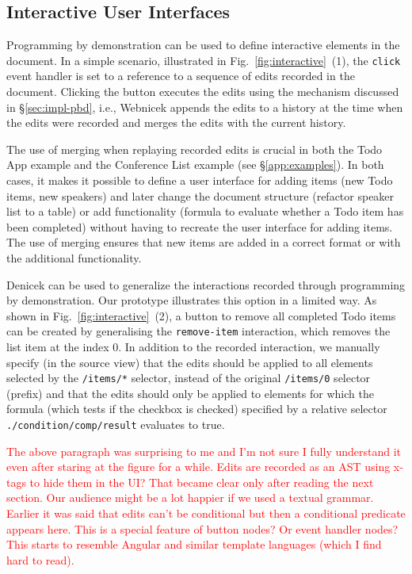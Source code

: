 \documentclass[sigconf,anonymous,screen]{acmart}
\newcommand{\note}[1]{\textcolor{red}{#1}}
\begin{document}

\subsection{Interactive User Interfaces}
\label{sec:impl-interaction}

Programming by demonstration can be used to define interactive elements in the document. In a
simple scenario, illustrated in Fig.~\ref{fig:interactive}~(1), the {\small\Verb_click_} event
handler is set to a reference to a sequence of edits recorded in the document. Clicking the button
executes the edits using the mechanism discussed in \S\ref{sec:impl-pbd}, i.e., Webnicek appends
the edits to a history at the time when the edits were recorded and merges the edits with the
current history.

The use of merging when replaying recorded edits is crucial in both the Todo App example and the
Conference List example (see \S\ref{app:examples}). In both cases, it makes it possible to define
a user interface for adding items (new Todo items, new speakers) and later change the document
structure (refactor speaker list to a table) or add functionality (formula to evaluate whether a
Todo item has been completed) without having to recreate the user interface for adding items.
The use of merging ensures that new items are added in a correct format or with the additional
functionality.

Denicek can be used to generalize the interactions recorded through programming by
demonstration. Our prototype illustrates this option in a limited way. As shown in
Fig.~\ref{fig:interactive}~(2), a button to remove all completed Todo items can be created by
generalising the {\small\Verb_remove-item_} interaction, which removes the list item at the index 0.
In addition to the recorded interaction, we manually specify (in the source view) that the edits
should be applied to all elements selected by the {\small\Verb_/items/*_} selector, instead of
the original {\small\Verb_/items/0_} selector (prefix) and that the edits should only be
applied to elements for which the formula (which tests if the checkbox is checked) specified by a
relative selector {\small\Verb_./condition/comp/result_} evaluates to true.

\note{The above paragraph was surprising to me and I'm not sure I fully understand it even after staring at the figure for a while. Edits are recorded as an AST using x-tags to hide them in the UI? That became clear only after reading the next section. Our audience might be a lot happier if we used a textual grammar. Earlier it was said that edits can't be conditional but then a conditional predicate appears here. This is a special feature of button nodes? Or event handler nodes? This starts to resemble Angular and similar template languages (which I find hard to read).}
\end{document}
